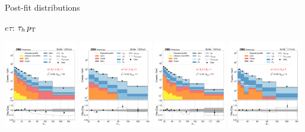 \begin{frame}{Post-fit distributions}
\begin{tcolorbox}{$e\tau$: $\tau_{h}\,p_{\mathrm{T}}$}
\begin{center}
            \includegraphics[width=0.24\textwidth]{chapters/Analysis/sectionStatisticalAnalysis/figures/fit/etau_cat_eq2_eq1}
            \includegraphics[width=0.24\textwidth]{chapters/Analysis/sectionStatisticalAnalysis/figures/fit/etau_cat_eq2_eq2}
            \includegraphics[width=0.24\textwidth]{chapters/Analysis/sectionStatisticalAnalysis/figures/fit/etau_cat_gt3_eq1}
            \includegraphics[width=0.24\textwidth]{chapters/Analysis/sectionStatisticalAnalysis/figures/fit/etau_cat_gt3_gt2}
        \end{center}
    \end{tcolorbox}
\end{frame}

